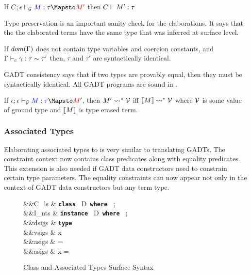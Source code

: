 \documentclass[manuscript,screen,nonacm]{acmart}
\begin{document}
\begin{lemma}
  If $\GTranslate C \empt \Tm \tau {\Tm'}$ then $C \vdash M' : \tau$
\end{lemma}
Type preservation is an important sanity check for the elaborations. It says that the the elaborated terms have the same type that was inferred at surface level.

\begin{theorem}
  If $dom(\Gamma)$ does not contain type variables and coercion constants, and $\Gamma \vdash_{c} \gamma : \tau\sim\tau'$ then, $\tau$ and $\tau'$ are syntactically identical.
\end{theorem}
GADT consistency says that if two types are provably equal, then they must be syntactically identical. All GADT programs are sound in \SFC.

\begin{theorem}
  If $\GTranslate \empt \empt \Tm \tau \Tm'$, then $M' \rightsquigarrow^* \mathcal{V}$ iff $\llbracket M\rrbracket \rightsquigarrow^* \mathcal{V}$ where $\mathcal{V}$ is some value of ground type and $\llbracket M\rrbracket$ is type erased term.
\end{theorem}

\subsubsection{Associated Types}
Elaborating associated types to \SFC is very similar to translating GADTs. The constraint context now contains class predicates along with equality predicates. This extension is also needed if GADT data constructors need to constrain certain type parameters. The equality constraints can now appear not only in the context of GADT data constructors but any term type.

\begin{figure}[ht]
  \centering
  \begin{syntax}
     &&C_{ls} \bnfeq& \textbf{\texttt{class }} D\App\many\alpha \textbf{\texttt{ where }} ; \\
     &&I_{nts} \bnfeq& \textbf{\texttt{instance }} D\App\many\tau \textbf{\texttt{ where }} ; \\
     &&dsigs \bnfeq& \textbf{\texttt{type }} \tau\\
     &&vsigs \bnfeq& x\co\tau\\
     &&asigs \bnfeq& \tau = \sigma\\
     &&asigs \bnfeq& x = \Tm
  \end{syntax}
  \caption[Class Syntax]{Class and Associated Types Surface Syntax}
  \label{fig:assoc-types-syntax}
\end{figure}
\end{document}
